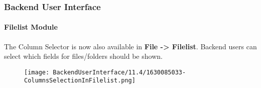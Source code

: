 %

\begin{frame}[fragile]
	\frametitle{Backend User Interface}
	\framesubtitle{Filelist Module}

	The Column Selector is now also available in \textbf{File -> Filelist}.
	Backend users can select which fields for files/folders should be shown.

	\begin{figure}
		\texttt{[image: BackendUserInterface/11.4/1630085033-ColumnsSelectionInFilelist.png]}
	\end{figure}

\end{frame}

